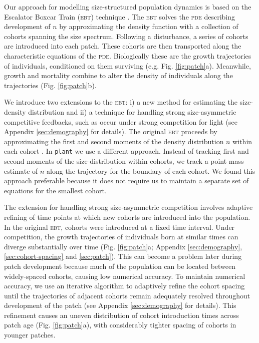 \documentclass[a4paper,11pt]{article}
\newcommand{\plant}{\texttt{plant}}
\begin{document}
Our approach for modelling size-structured population dynamics is
based on the Escalator Boxcar Train (\textsc{ebt}) technique
\citep{Deroos-1988, Deroos-1992, Deroos-1997}. The \textsc{ebt} solves
the \textsc{pde} describing development of \(n\) by approximating the
density function with a collection of cohorts spanning the size
spectrum. Following a disturbance, a series of cohorts are introduced
into each patch. These cohorts are then transported along the
characteristic equations of the \textsc{pde}. Biologically these are
the growth trajectories of individuals, conditioned on them surviving
(e.g. Fig. \ref{fig:patch}a). Meanwhile, growth and mortality combine
to alter the density of individuals along the trajectories
(Fig. \ref{fig:patch}b).

We introduce two extensions to the \textsc{ebt}: i) a new method for
estimating the size-density distribution and ii) a technique for
handling strong size-asymmetric competitive feedbacks, such as occur
under strong competition for light (see Appendix \ref{sec:demography}
for details). The original \textsc{ebt} proceeds by approximating the
first and second moments of the density distribution \(n\) within each
cohort \citep{Deroos-1997}.
%
In {\plant} we use a different approach. Instead of tracking first and
second moments of the size-distribution within cohorts, we track a
point mass estimate of \(n\) along the trajectory for the boundary of
each cohort. We found this approach preferable because it does not
require us to maintain a separate set of equations for the smallest
cohort.

The extension for handling strong size-asymmetric competition involves
adaptive refining of time points at which new cohorts are introduced
into the population. In the original \textsc{ebt}, cohorts were
introduced at a fixed time interval. Under competition, the growth
trajectories of individuals born at similar times can diverge
substantially over time (Fig. \ref{fig:patch}a; Appendix
\ref{sec:demography}, \ref{sec:cohort-spacing} and
\ref{sec:patch}). This can become a problem later during patch
development because much of the population can be located between
widely-spaced cohorts, causing low numerical accuracy. To maintain
numerical accuracy, we use an iterative algorithm to adaptively refine
the cohort spacing until the trajectories of adjacent cohorts remain
adequately resolved throughout development of the patch (see Appendix
\ref{sec:demography} for details). This refinement causes an uneven
distribution of cohort introduction times across patch age (Fig.
\ref{fig:patch}a), with considerably tighter spacing of cohorts in
younger patches.
\end{document}
